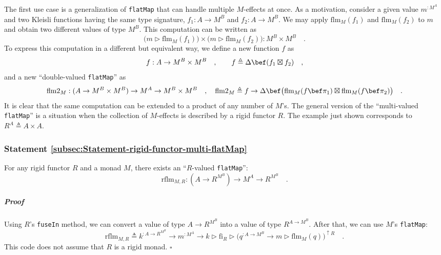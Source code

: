 The first use case is a generalization of \lstinline!flatMap! that
can handle multiple $M$-effects at once. As a motivation, consider
a given value $m^{:M^{A}}$ and two Kleisli functions having the same
type signature, $f_{1}:A\rightarrow M^{B}$ and $f_{2}:A\rightarrow M^{B}$.
We may apply $\text{flm}_{M}(f_{1})$ and $\text{flm}_{M}(f_{2})$
to $m$ and obtain two different values of type $M^{B}$. This computation
can be written as
\[
\big(m\triangleright\text{flm}_{M}(f_{1})\big)\times\big(m\triangleright\text{flm}_{M}(f_{2})\big):M^{B}\times M^{B}\quad.
\]
To express this computation in a different but equivalent way, we
define a new function $f$ as 
\[
f:A\rightarrow M^{B}\times M^{B}\quad,\quad\quad f\triangleq\Delta\bef(f_{1}\boxtimes f_{2})\quad,
\]
and a new \textsf{``}double-valued \lstinline!flatMap!\textsf{''} as 
\[
\text{flm2}_{M}:(A\rightarrow M^{B}\times M^{B})\rightarrow M^{A}\rightarrow M^{B}\times M^{B}\quad,\quad\text{flm2}_{M}\triangleq f\rightarrow\Delta\bef\big(\text{flm}_{M}(f\bef\pi_{1})\boxtimes\text{flm}_{M}(f\bef\pi_{2})\big)\quad.
\]
It is clear that the same computation can be extended to a product
of any number of $M$\textsf{'}s. The general version of the \textsf{``}multi-valued
\lstinline!flatMap!\textsf{''} is a situation when the collection of $M$-effects
is described by a rigid functor $R$. The example just shown corresponds
to $R^{A}\triangleq A\times A$.

\subsubsection{Statement \label{subsec:Statement-rigid-functor-multi-flatMap}\ref{subsec:Statement-rigid-functor-multi-flatMap}}

For any rigid functor $R$ and a monad $M$, there exists an \textsf{``}$R$-valued
\lstinline!flatMap!\textsf{''}:
\[
\text{rflm}_{M,R}:(A\rightarrow R^{M^{B}})\rightarrow M^{A}\rightarrow R^{M^{B}}\quad.
\]


\subparagraph{Proof}

Using $R$\textsf{'}s \lstinline!fuseIn! method, we can convert a value of
type $A\rightarrow R^{M^{B}}$ into a value of type $R^{A\rightarrow M^{B}}$.
After that, we can use $M$\textsf{'}s \lstinline!flatMap!:
\[
\text{rflm}_{M,R}\triangleq k^{:A\rightarrow R^{M^{B}}}\rightarrow m^{:M^{A}}\rightarrow k\triangleright\text{fi}_{R}\triangleright\big(q^{:A\rightarrow M^{B}}\rightarrow m\triangleright\text{flm}_{M}(q)\big)^{\uparrow R}\quad.
\]
This code does not assume that $R$ is a rigid monad. $\square$

